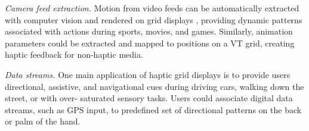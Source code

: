 \emph{Camera feed extraction.}
Motion from video feeds can be automatically extracted with computer vision and rendered on grid displays \cite{Kim2014}, providing dynamic patterns associated with actions during sports, movies, and games.
Similarly, animation parameters could be extracted and mapped to positions on a VT grid, creating haptic feedback for non-haptic media.

\emph{Data streams.}
One main application of haptic grid displays is to provide users directional, assistive, and navigational cues during driving cars, walking down the street, or with over-
saturated sensory tasks.
Users could associate digital data streams, such as GPS input, to predefined set of directional patterns on the back or palm of the hand.



%






